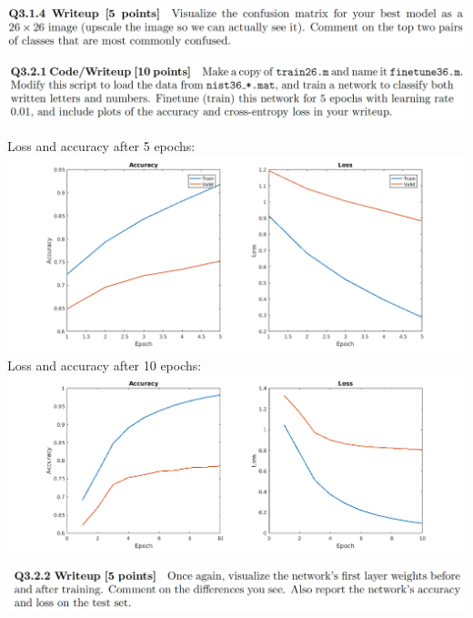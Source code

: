 \documentclass[12pt,letterpaper,boxed]{hmcpset}
\begin{document}
\begin{problem}[]
\includegraphics[width=\textwidth]{3_1_4.png}
\end{problem}

\begin{solution}
\end{solution}
\newpage

\begin{problem}[]
\includegraphics[width=\textwidth]{3_2_1.png}
\end{problem}

\begin{solution}
Loss and accuracy after 5 epochs:\\
\includegraphics[width=\textwidth]{3_2_1_1.png}\\
Loss and accuracy after 10 epochs:\\
\includegraphics[width=\textwidth]{3_2_1_2.png}\\
\end{solution}
\newpage

\begin{problem}[]
\includegraphics[width=\textwidth]{3_2_2.png}
\end{problem}
\end{document}
